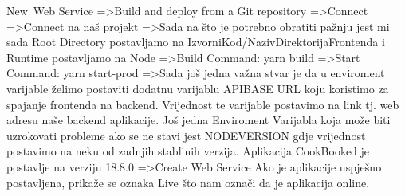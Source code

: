 			\noindent New\ Web Service =\textgreater  Build and deploy from a Git repository =\textgreater  Connect
			 =\textgreater  Connect na naš projekt =\textgreater  Sada na što je potrebno obratiti pažnju jest mi sada Root Directory postavljamo na IzvorniKod/NazivDirektorijaFrontenda i Runtime postavljamo na Node =\textgreater  Build Command: yarn build =\textgreater  Start Command: yarn start-prod =\textgreater  Sada još jedna važna stvar je da u enviroment varijable želimo postaviti dodatnu varijablu API\textunderscore BASE \textunderscore URL koju koristimo za spajanje frontenda na backend. Vrijednost te varijable postavimo na link tj. web adresu naše backend aplikacije. Još jedna Enviroment Varijabla koja može biti uzrokovati probleme ako se ne stavi jest NODE\textunderscore VERSION gdje vrijednost postavimo na neku od zadnjih stablinih verzija. Aplikacija CookBooked je postavlje na verziju 18.8.0 =\textgreater  Create Web Service\newline
			\bigbreak
			\noindent Ako je aplikacije uspješno postavljena, prikaže se oznaka Live što nam označi da je aplikacija online.
			
			\eject 
			
			
			
			
			
			
			
			
			
			
			
			
			
			
			
			